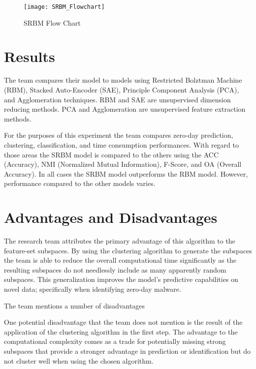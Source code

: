 \documentclass[]{article}
\begin{document}
\begin{figure}[h]
	\centering
	\texttt{[image: SRBM\_Flowchart]}
	\caption{SRBM Flow Chart \cite{Liu2021}}
\end{figure}


\section{Results}

The team compares their model to models using Restricted Bolztman Machine (RBM), Stacked Auto-Encoder (SAE), Principle Component Analysis (PCA), and Agglomeration techniques.
RBM and SAE are unsupervised dimension reducing methods. 
PCA and Agglomeration are unsupervised feature extraction methods.

For the purposes of this experiment the team compares zero-day prediction, clustering, classification, and time consumption performances.
With regard to those areas the SRBM model is compared to the others using the
ACC (Accuracy),
NMI (Normalized Mutual Information),
F-Score,
and OA (Overall Accuracy).
In all cases the SRBM model outperforms the RBM model. 
However, performance compared to the other models varies.

\section{Advantages and Disadvantages}

The research team attributes the primary advantage of this algorithm to the feature-set subspaces.
By using the clustering algorithm to generate the subspaces the team is able to reduce the overall computational time significantly as the resulting subspaces do not needlessly include as many apparently random subspaces.
This generalization improves the model's predictive capabilities on novel data; specifically when identifying zero-day malware.

The team mentions a number of disadvantages

One potential disadvantage that the team does not mention is the result of the application of the clustering algorithm in the first step.
The advantage to the computational complexity comes as a trade for potentially missing strong subspaces that provide a stronger advantage in prediction or identification but do not cluster well when using the chosen algorithm.
\end{document}

